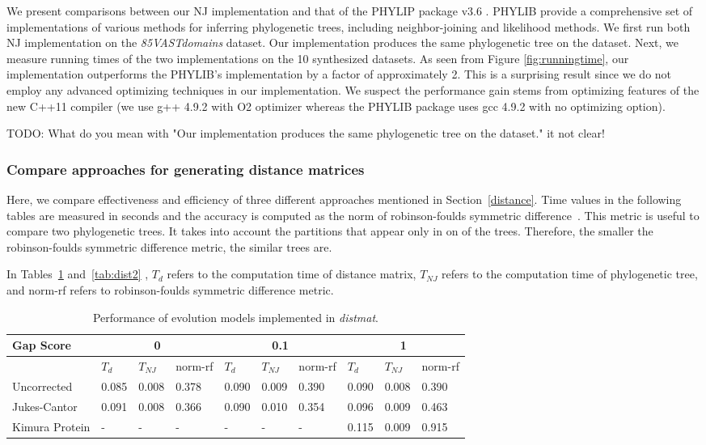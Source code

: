 \documentclass[11pt,letterpaper]{article}
\theoremstyle{definition}
\begin{document}
We present comparisons between our NJ implementation and that of the PHYLIP package v3.6 \cite{felsenstein2005phylip}. PHYLIB provide a comprehensive set of implementations of various methods for inferring phylogenetic trees, including neighbor-joining and likelihood methods. We first run both NJ implementation on the \textit{85VASTdomains} dataset. Our implementation produces the same phylogenetic tree on the dataset. Next, we measure running times of the two implementations on the 10 synthesized datasets. As seen from Figure \ref{fig:runningtime}, our implementation outperforms the PHYLIB's implementation by a factor of approximately 2. This is a surprising result since we do not employ any advanced optimizing techniques in our implementation. We suspect the performance gain stems from optimizing features of the new C++11 compiler (we use g++ 4.9.2 with O2 optimizer whereas the PHYLIB package uses gcc 4.9.2 with no optimizing option).  

TODO: What do you mean with "Our implementation produces the same phylogenetic tree on the dataset." it not clear!

\subsubsection{Compare approaches for generating distance matrices}

Here, we compare effectiveness and efficiency of three different approaches mentioned in Section~\ref{distance}. Time values in the following tables are measured in seconds and the accuracy is computed as the norm of robinson-foulds symmetric difference~\cite{robinson1981comparison}. This metric is useful to compare two phylogenetic trees. It takes into account the partitions that appear only in on of the trees. Therefore, the smaller the robinson-foulds symmetric difference metric, the similar trees are.

In Tables~\ref{tab:dist1} and~\ref{tab:dist2} , $T_d$ refers to the computation time of distance matrix, $T_{NJ}$ refers to the computation time of phylogenetic tree, and norm-rf refers to robinson-foulds symmetric difference metric.

\begin{table}[h]
\centering
	\begin{tabular}{l|lll|lll|lll}
Gap Score	& \multicolumn{3}{c}{0} & \multicolumn{3}{c}{0.1} &  \multicolumn{3}{c}{1} \\
\hline
&	$T_d$	& $T_{NJ}$	& norm-rf &	$T_d$	& $T_{NJ}$	& norm-rf &	$T_d$	& $T_{NJ}$	& norm-rf \\
\hline
Uncorrected		&	0.085	&	0.008	&	0.378	&	0.090	&	0.009	&	0.390	&	0.090	&	0.008	&	0.390	\\
Jukes-Cantor	&	0.091	&	0.008	&	0.366	&	0.090	&	0.010	&	0.354	&	0.096	&	0.009	&	0.463	\\
Kimura Protein	&	-	&	-	&	-	&	-	&	-	&	-	&	0.115	&	0.009	&	0.915	\\
\hline
\end{tabular}
\caption{Performance of evolution models implemented in \textit{distmat}.}\label{tab:dist1}
\end{table}
\end{document}

